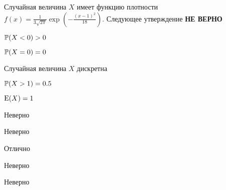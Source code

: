 
\begin{question}
Случайная величина \(X\) имеет функцию плотности
\(f(x)=\frac{1}{3\sqrt{2\pi}} \exp\left(-\frac{(x-1)^2}{18} \right)\).
Следующее утверждение \textbf{НЕ ВЕРНО}
\begin{answerlist}
  \item \(\P(X<0)>0\)
  \item \(\P(X=0)=0\)
  \item Случайная величина \(X\) дискретна
  \item \(\P(X>1)=0.5\)
  \item \(\E(X)=1\)
\end{answerlist}
\end{question}

\begin{solution}
\begin{answerlist}
  \item Неверно
  \item Неверно
  \item Отлично
  \item Неверно
  \item Неверно
\end{answerlist}
\end{solution}

